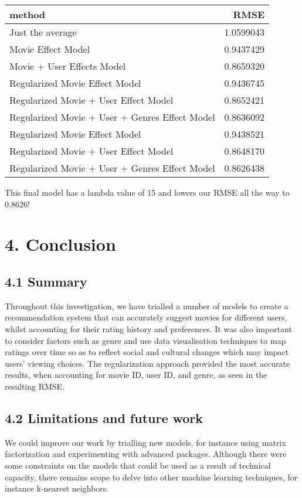 \documentclass[]{article}
\begin{document}
\begin{longtable}[]{@{}lr@{}}
\toprule
method & RMSE\tabularnewline
\midrule
\endhead
Just the average & 1.0599043\tabularnewline
Movie Effect Model & 0.9437429\tabularnewline
Movie + User Effects Model & 0.8659320\tabularnewline
Regularized Movie Effect Model & 0.9436745\tabularnewline
Regularized Movie + User Effect Model & 0.8652421\tabularnewline
Regularized Movie + User + Genres Effect Model &
0.8636092\tabularnewline
Regularized Movie Effect Model & 0.9438521\tabularnewline
Regularized Movie + User Effect Model & 0.8648170\tabularnewline
Regularized Movie + User + Genres Effect Model &
0.8626438\tabularnewline
\bottomrule
\end{longtable}

This final model has a lambda value of 15 and lowers our RMSE all the
way to 0.8626!

\hypertarget{conclusion-1}{%
\section{4. Conclusion}\label{conclusion-1}}

\hypertarget{summary-1}{%
\subsection{4.1 Summary}\label{summary-1}}

Throughout this investigation, we have trialled a number of models to
create a recommendation system that can accurately suggest movies for
different users, whilst accounting for their rating history and
preferences. It was also important to consider factors such as genre and
use data visualisation techniques to map ratings over time so as to
reflect social and cultural changes which may impact users' viewing
choices. The regularization approach provided the most accurate results,
when accounting for movie ID, user ID, and genre, as seen in the
resulting RMSE.

\hypertarget{limitations-and-future-work-1}{%
\subsection{4.2 Limitations and future
work}\label{limitations-and-future-work-1}}

We could improve our work by trialling new models, for instance using
matrix factorization and experimenting with advanced packages. Although
there were some constraints on the models that could be used as a result
of technical capacity, there remains scope to delve into other machine
learning techniques, for instance k-nearest neighbors.
\end{document}
